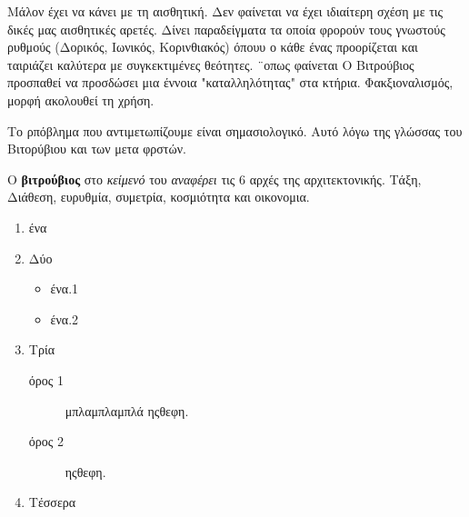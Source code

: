   Μάλον έχει να κάνει με τη  αισθητική. Δεν φαίνεται να έχει ιδιαίτερη σχέση με τις δικές μας αισθητικές αρετές.
  Δίνει παραδείγματα τα οποία φρορούν τους γνωστούς ρυθμούς (Δορικός, Ιωνικός, Κορινθιακός) όπουυ ο κάθε ένας προορίζεται και ταιριάζει καλύτερα με συγκεκτιμένες θεότητες.
  ¨οπως φαίνεται Ο Βιτρούβιος προσπαθεί να προσδώσει μια έννοια "καταλληλότητας" στα κτήρια. Φακξιοναλισμός, μορφή ακολουθεί τη χρήση.
  
  Το ρπόβλημα που αντιμετωπίζουμε είναι σημασιολογικό. Αυτό λόγω της γλώσσας του Βιτορύβιου και των μετα φρστών.
  
  
  Ο {\color{red}\textbf{βιτρούβιος}} στο \emph{κείμενό} του \textit{αναφέρει} τις 6 αρχές της αρχιτεκτονικής. Τάξη, Διάθεση, ευρυθμία, συμετρία, κοσμιότητα και οικονομια. \cite{scranton_vitruvius_1974, vitruvius-lefas}
  
\begin{enumerate}[noitemsep] %
  \item ένα
  \item Δύο
  
  \begin{itemize}
    \item ένα.1
    \item ένα.2
  \end{itemize}
  
  \item Τρία
  
    \begin{description}
      \item[όρος 1] μπλαμπλαμπλά ηςθεφη.
      \item[όρος 2] ηςθεφη.
    \end{description}
  
  \item Τέσσερα
\end{enumerate}
